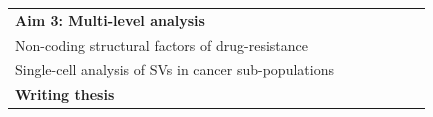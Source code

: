 \documentclass[twoside,fontsize=12pt]{article}
\begin{document}
\begin{table}[h]
\begin{center}
\begin{tabular}{lllllll}
\textbf{Aim 3: Multi-level analysis}            &                                                                                                  &                                                 &  & \cellcolor[HTML]{343434}{\color[HTML]{343434} } & \cellcolor[HTML]{343434}{\color[HTML]{343434} } & \cellcolor[HTML]{343434}{\color[HTML]{343434} } \\
\hspace*{1em} Non-coding structural factors of drug-resistance                                                        &                                                 &                                                 &                        & \cellcolor[HTML]{656565}                  & \cellcolor[HTML]{656565}                     &                    \\
\hspace*{1em} Single-cell analysis of SVs in cancer sub-populations                                                       &                                                 &                                                 &                        &                & \cellcolor[HTML]{656565}                     & \cellcolor[HTML]{656565}                   \\

\textbf{Writing thesis}                         &                                                 &                                                 &                                                 &                                                 &                                                                        & \cellcolor[HTML]{343434}                       
\end{tabular}
\end{center}
\end{table}
\end{document}
